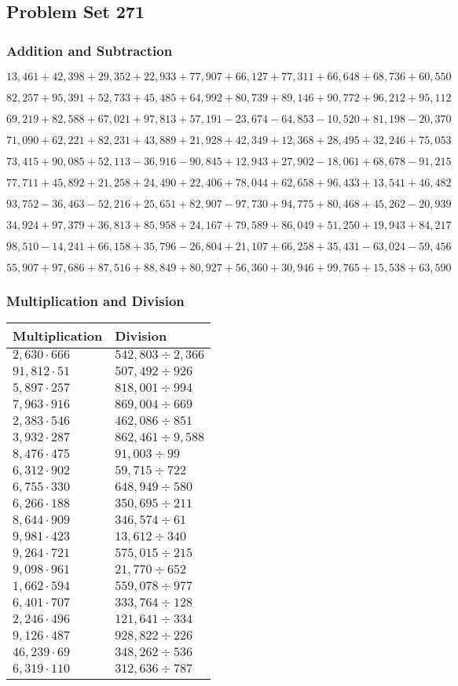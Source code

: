 \hypertarget{problem-set-271}{%
\subsection{Problem Set 271}\label{problem-set-271}}

\hypertarget{addition-and-subtraction}{%
\subsubsection{Addition and
Subtraction}\label{addition-and-subtraction}}

\(13,461+42,398+29,352+22,933+77,907+66,127+77,311+66,648+68,736+60,550\)

\(82,257+95,391+52,733+45,485+64,992+80,739+89,146+90,772+96,212+95,112\)

\(69,219+82,588+67,021+97,813+57,191-23,674-64,853-10,520+81,198-20,370\)

\(71,090+62,221+82,231+43,889+21,928+42,349+12,368+28,495+32,246+75,053\)

\(73,415+90,085+52,113-36,916-90,845+12,943+27,902-18,061+68,678-91,215\)

\(77,711+45,892+21,258+24,490+22,406+78,044+62,658+96,433+13,541+46,482\)

\(93,752-36,463-52,216+25,651+82,907-97,730+94,775+80,468+45,262-20,939\)

\(34,924+97,379+36,813+85,958+24,167+79,589+86,049+51,250+19,943+84,217\)

\(98,510-14,241+66,158+35,796-26,804+21,107+66,258+35,431-63,024-59,456\)

\(55,907+97,686+87,516+88,849+80,927+56,360+30,946+99,765+15,538+63,590\)

\hypertarget{multiplication-and-division}{%
\subsubsection{Multiplication and
Division}\label{multiplication-and-division}}

\begin{longtable}[]{@{}ll@{}}
\toprule
Multiplication & Division\tabularnewline
\midrule
\endhead
\(2,630\cdot666\) & \(542,803÷2,366\)\tabularnewline
\(91,812\cdot51\) & \(507,492÷926\)\tabularnewline
\(5,897\cdot257\) & \(818,001÷994\)\tabularnewline
\(7,963\cdot916\) & \(869,004÷669\)\tabularnewline
\(2,383\cdot546\) & \(462,086÷851\)\tabularnewline
\(3,932\cdot287\) & \(862,461÷9,588\)\tabularnewline
\(8,476\cdot475\) & \(91,003÷99\)\tabularnewline
\(6,312\cdot902\) & \(59,715÷722\)\tabularnewline
\(6,755\cdot330\) & \(648,949÷580\)\tabularnewline
\(6,266\cdot188\) & \(350,695÷211\)\tabularnewline
\(8,644\cdot909\) & \(346,574÷61\)\tabularnewline
\(9,981\cdot423\) & \(13,612÷340\)\tabularnewline
\(9,264\cdot721\) & \(575,015÷215\)\tabularnewline
\(9,098\cdot961\) & \(21,770÷652\)\tabularnewline
\(1,662\cdot594\) & \(559,078÷977\)\tabularnewline
\(6,401\cdot707\) & \(333,764÷128\)\tabularnewline
\(2,246\cdot496\) & \(121,641÷334\)\tabularnewline
\(9,126\cdot487\) & \(928,822÷226\)\tabularnewline
\(46,239\cdot69\) & \(348,262÷536\)\tabularnewline
\(6,319\cdot110\) & \(312,636÷787\)\tabularnewline
\bottomrule
\end{longtable}
